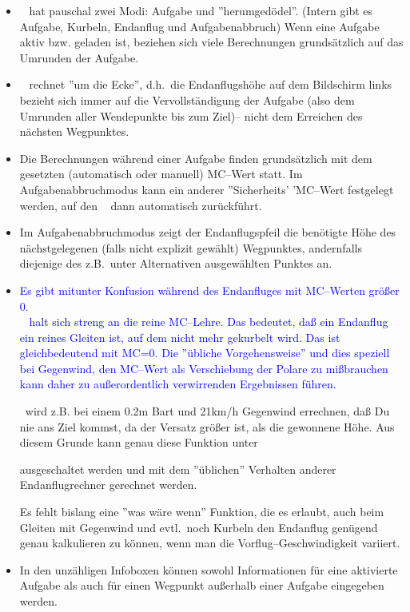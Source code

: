 \begin{itemize}
\item \xc~ hat pauschal zwei Modi: Aufgabe und ''herumgedödel''. (Intern gibt es Aufgabe, Kurbeln, Endanflug und Aufgabenabbruch)
Wenn eine Aufgabe aktiv bzw. geladen ist, beziehen sich viele Berechnungen grundsätzlich auf
das Umrunden der Aufgabe.
\item \xc~ rechnet ''um die Ecke'', d.h.\ die Endanflugshöhe auf dem Bildschirm links bezieht
sich immer auf die Vervollständigung der Aufgabe (also dem Umrunden aller Wendepunkte bis zum Ziel)--
nicht dem Erreichen des nächsten Wegpunktes.
\item Die Berechnungen während einer Aufgabe finden grundsätzlich mit dem gesetzten (automatisch oder manuell)
MC--Wert statt. Im Aufgabenabbruchmodus kann ein anderer ''Sicherheits' 'MC--Wert festgelegt
werden, auf den  \xc~ dann automatisch zurückführt.
\item Im Aufgabenabbruchmodus zeigt der Endanflugspfeil die benötigte Höhe des nächst\-ge\-le\-ge\-nen
(falls nicht explizit gewählt) Wegpunktes, andernfalls diejenige des z.B.\ unter
Alternativen ausgewählten Punktes an.
\item \textcolor{blue}{Es gibt mitunter Konfusion während des Endanfluges mit MC--Werten größer 0. \\
\xc~ halt sich streng an die reine MC--Lehre. Das bedeutet, daß ein Endanflug ein reines Gleiten ist, auf dem {\textsf nicht mehr gekurbelt} wird. Das ist gleichbedeutend mit MC=0.
Die ''übliche Vorgehensweise'' und dies speziell bei Gegenwind, den MC--Wert als Verschiebung der Polare zu mißbrauchen kann
daher zu außerordentlich verwirrenden Ergebnissen führen.}

\vspace{1em}
\xc~wird z.B.  bei einem 0.2m Bart und 21km/h Gegenwind errechnen, daß Du nie ans Ziel kommst, da der Versatz größer ist,
als die gewonnene Höhe. Aus diesem Grunde kann genau diese Funktion unter

\vspace{1em}
\bc\sk\blink{}\blink{}\blink{}\ec

\vspace{1em}
ausgeschaltet werden und mit dem ''üblichen'' Verhalten anderer Endanflugrechner gerechnet werden.

Es fehlt bislang eine ''was wäre wenn'' Funktion, die es erlaubt, auch beim Gleiten mit Gegenwind und
evtl.\ noch Kurbeln den Endanflug genügend genau kalkulieren zu können, wenn man die Vorflug--Geschwindigkeit variiert.
\item In den unzähligen Infoboxen können sowohl Informationen für eine aktivierte Aufgabe als auch für einen Wegpunkt außerhalb
einer Aufgabe eingegeben werden.
\end{itemize}
\printindex


